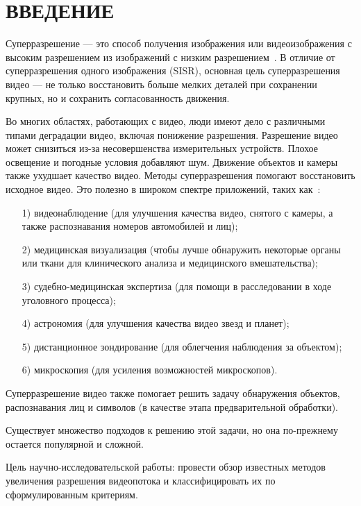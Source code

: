 \documentclass{bmstu}
\begin{document}
{\centering \chapter*{ВВЕДЕНИЕ}}

Суперразрешение --- это способ получения изображения или видеоизображения с высоким разрешением из изображений с низким разрешением~\cite{Park2003}. 
В отличие от суперразрешения одного изображения (SISR), основная цель суперразрешения видео --- не только восстановить больше мелких деталей при сохранении крупных, но и сохранить согласованность движения.

Во многих областях, работающих с видео, люди имеют дело с различными типами деградации видео, включая понижение разрешения. 
Разрешение видео может снизиться из-за несовершенства измерительных устройств. 
Плохое освещение и погодные условия добавляют шум. 
Движение объектов и камеры также ухудшает качество видео. 
Методы суперразрешения помогают восстановить исходное видео. 
Это полезно в широком спектре приложений, таких как~\cite{Daithankar2021}:
\begin{enumerate}
\item[1)] видеонаблюдение (для улучшения качества видео, снятого с камеры, а также распознавания номеров автомобилей и лиц);
\item[2)] медицинская визуализация (чтобы лучше обнаружить некоторые органы или ткани для клинического анализа и медицинского вмешательства);
\item[3)] судебно-медицинская экспертиза (для помощи в расследовании в ходе уголовного процесса);
\item[4)] астрономия (для улучшения качества видео звезд и планет);
\item[5)] дистанционное зондирование (для облегчения наблюдения за объектом);
\item[6)] микроскопия (для усиления возможностей микроскопов).
\end{enumerate}

Суперразрешение видео также помогает решить задачу обнаружения объектов, распознавания лиц и символов (в качестве этапа предварительной обработки).

Существует множество подходов к решению этой задачи, но она по-прежнему остается популярной и сложной.

Цель научно-исследовательской работы: провести обзор известных методов увеличения разрешения видеопотока и классифицировать их по сформулированным критериям.
\end{document}
